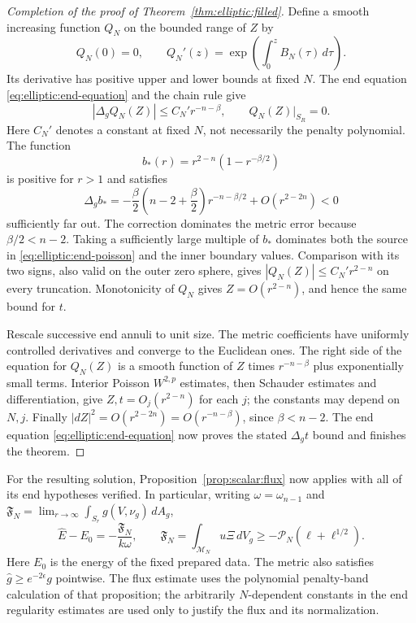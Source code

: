 \begin{proof}[Completion of the proof of Theorem~\ref{thm:elliptic:filled}]
Define a smooth increasing function $Q_N$ on the bounded range of $Z$
by
\[
 Q_N(0)=0,\qquad Q_N'(z)
 =\exp\left(\int_0^z B_N(\tau)\,d\tau\right).
\]
Its derivative has positive upper and lower bounds at fixed $N$.
The end equation \eqref{eq:elliptic:end-equation} and the chain rule give
\begin{equation}\label{eq:elliptic:end-poisson}
 |\Delta_g Q_N(Z)|\le C_N' r^{-n-\beta},
 \qquad Q_N(Z)|_{S_R}=0.
\end{equation}
Here $C_N'$ denotes a constant at fixed $N$, not necessarily the
penalty polynomial.  The function
\[
 b_*(r)=r^{2-n}(1-r^{-\beta/2})
\]
is positive for $r>1$ and satisfies
\[
 \Delta_g b_*
 =-\frac\beta2\left(n-2+\frac\beta2\right)r^{-n-\beta/2}
          +O(r^{2-2n})<0
\]
sufficiently far out.  The correction dominates the metric error
because $\beta/2<n-2$.
Taking a sufficiently large multiple of $b_*$ dominates both the
source in \eqref{eq:elliptic:end-poisson} and the inner
boundary values.  Comparison with its two signs, also valid on the
outer zero sphere, gives
$|Q_N(Z)|\le C_N' r^{2-n}$ on every truncation.  Monotonicity of $Q_N$
gives $Z=O(r^{2-n})$, and hence the same bound for $t$.

Rescale successive end annuli to unit size.  The metric coefficients
have uniformly controlled derivatives and converge to the Euclidean
ones.  The right side of the equation for $Q_N(Z)$ is a smooth
function of $Z$ times $r^{-n-\beta}$ plus exponentially small terms.
Interior Poisson $W^{2,p}$ estimates, then Schauder estimates and
differentiation, give $Z,t=O_j(r^{2-n})$ for each $j$; the constants
may depend on $N,j$.  Finally
$|dZ|^2=O(r^{2-2n})=O(r^{-n-\beta})$, since $\beta<n-2$.
The end equation \eqref{eq:elliptic:end-equation} now proves the stated
$\Delta_g t$ bound and finishes the theorem.
\end{proof}

For the resulting solution, Proposition~\ref{prop:scalar:flux} now
applies with all of its end hypotheses verified.  In particular,
writing $\omega=\omega_{n-1}$ and
$\mathfrak F_N=\lim_{r\to\infty}\int_{S_r}g(V,\nu_g)\,dA_g$,
\begin{equation}\label{eq:elliptic:constructed-energy}
 \widehat E-E_0=-\frac{\mathfrak F_N}{k\omega},\qquad
 \mathfrak F_N=\int_{\mathcal M_N}u\Xi\,dV_g
       \ge-\mathcal P_N(\ell+\ell^{1/2}).
\end{equation}
Here $E_0$ is the energy of the fixed prepared data.  The metric also
satisfies $\widehat g\ge e^{-2\epsilon}g$ pointwise.  The flux estimate
uses the polynomial penalty-band calculation of that proposition;
the arbitrarily $N$-dependent constants in the end regularity estimates
are used only to justify the flux and its normalization.

